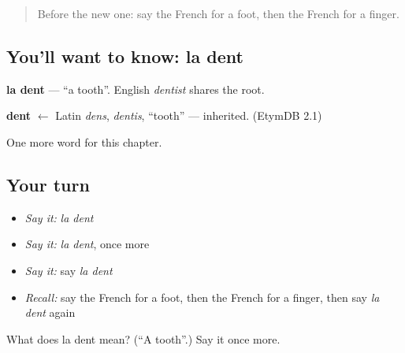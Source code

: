 \begin{quote}
Before the new one: say the French for a foot, then the French for a finger.
\end{quote}

\subsection*{You'll want to know: la dent}
\textbf{la dent} — \textquotedblleft{}a tooth\textquotedblright{}. English \emph{dentist} shares the root.

\begin{cousinweb}
\textbf{dent} $\leftarrow$ Latin \emph{dens}, \emph{dentis}, \textquotedblleft{}tooth\textquotedblright{} — inherited. (EtymDB 2.1)
\end{cousinweb}

\begin{grammarlens}[title={What you've built}]
One more word for this chapter.
\end{grammarlens}

\subsection*{Your turn}
\begin{itemize}
\raggedright
  \item \emph{Say it:} \emph{la dent}
  \item \emph{Say it:} \emph{la dent}, once more
  \item \emph{Say it:} say \emph{la dent}
  \item \emph{Recall:} say the French for a foot, then the French for a finger, then say \emph{la dent} again
\end{itemize}

\begin{tcolorbox}[breakable,colback=teal!4,colframe=teal!35!black,title={Before you move on}]
What does la dent mean? (\textquotedblleft{}A tooth\textquotedblright{}.) Say it once more.
\end{tcolorbox}
